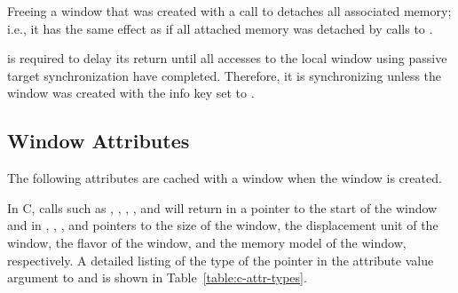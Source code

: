 Freeing a window that was created with a call to
 detaches all associated memory;
i.e., it has the same effect as if all attached memory was
detached by calls to .

 is required to delay its return until all
accesses to the local window using passive target synchronization have completed.
Therefore, it is synchronizing unless the window was created with the  info key set to .

\subsection{Window Attributes}

The following attributes are cached with a
window when the
window is created.
\begin{constlist}
\end{constlist}

In C, calls such as
, 
\newline
{}, 
\newline
{}, 
\newline
{}, and
\newline
{}
will return in  a pointer to the start of the window
 and in ,
, , and  
pointers to the size of the window, the displacement unit of the
window, the flavor of the window, and the memory model of the window, 
respectively.
%
A detailed listing of the type of the pointer in the attribute value
argument to  and
 is shown in
Table~\ref{table:c-attr-types}.

